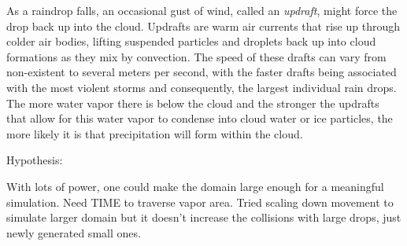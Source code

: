 \documentclass[twocolumn,a4paper,10pt]{article}
\begin{document}
As a raindrop falls, an occasional gust of wind, called an \emph{updraft}, might
force the drop back up into the cloud. Updrafts are warm air currents that rise
up through colder air bodies, lifting suspended particles and droplets back up
into cloud formations as they mix by convection. The speed of these drafts can
vary from non-existent to several meters per second, with the faster drafts
being associated with the most violent storms and consequently, the largest
individual rain drops. The more water vapor there is below the cloud and the
stronger the updrafts that allow for this water vapor to condense into cloud
water or ice particles, the more likely it is that precipitation will form
within the cloud.

Hypothesis:

With lots of power, one could make the domain large enough for a meaningful
simulation. Need TIME to traverse vapor area. Tried scaling down movement to
simulate larger domain but it doesn't increase the collisions with large
drops, just newly generated small ones.
\end{document}
